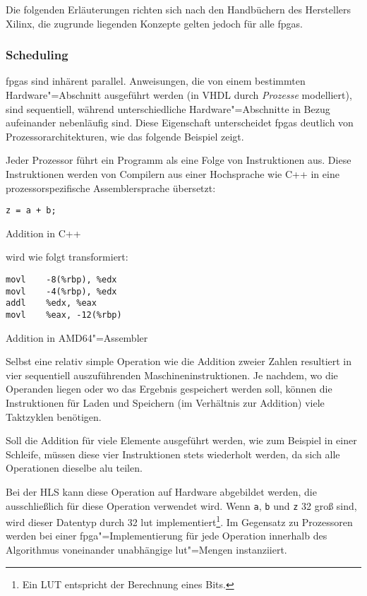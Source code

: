 Die folgenden Erläuterungen richten sich nach den Handbüchern des Herstellers
Xilinx, die zugrunde liegenden Konzepte gelten jedoch für alle \gls{fpga}s.

\subsubsection{Scheduling}

\gls{fpga}s sind inhärent parallel. Anweisungen, die von einem bestimmten
Hardware"=Abschnitt ausgeführt werden (in VHDL durch \textit{Prozesse}
modelliert), sind sequentiell, während unterschiedliche Hardware"=Abschnitte in
Bezug aufeinander nebenläufig sind. Diese Eigenschaft unterscheidet \gls{fpga}s
deutlich von Prozessorarchitekturen, wie das folgende Beispiel zeigt.

Jeder Prozessor führt ein Programm als eine Folge von Instruktionen aus. Diese
Instruktionen werden von Compilern aus einer Hochsprache wie C++ in eine
prozessorspezifische Assemblersprache übersetzt:
\begin{code}
    \begin{verbatim}
z = a + b;
    \end{verbatim}
    \caption{Addition in C++}
\end{code}
wird wie folgt transformiert:
\begin{code}
    \begin{verbatim}
movl    -8(%rbp), %edx
movl    -4(%rbp), %edx
addl    %edx, %eax
movl    %eax, -12(%rbp)
    \end{verbatim}
    \caption{Addition in AMD64"=Assembler}
\end{code}
Selbst eine relativ simple Operation wie die Addition zweier Zahlen resultiert
in vier sequentiell auszuführenden Maschineninstruktionen. Je nachdem, wo die
Operanden liegen oder wo das Ergebnis gespeichert werden soll, können die
Instruktionen für Laden und Speichern (im Verhältnis zur Addition) viele
Taktzyklen benötigen. \cite[vgl.][18]{hlsintro2019}

Soll die Addition für viele Elemente ausgeführt werden, wie zum Beispiel in
einer Schleife, müssen diese vier Instruktionen stets wiederholt werden, da sich
alle Operationen dieselbe \gls{alu} teilen.

Bei der HLS kann diese Operation auf Hardware abgebildet werden, die
ausschließlich für diese Operation verwendet wird. Wenn \texttt{a}, \texttt{b}
und \texttt{z} \SI{32}{\bit} groß sind, wird dieser Datentyp durch 32 \gls{lut}
implementiert\footnote{Ein LUT entspricht der Berechnung eines Bits.}.
Im Gegensatz zu Prozessoren werden bei einer \gls{fpga}"=Implementierung für jede
Operation innerhalb des Algorithmus voneinander unabhängige \gls{lut}"=Mengen
instanziiert.
\cite[vgl.][19]{hlsintro2019}

